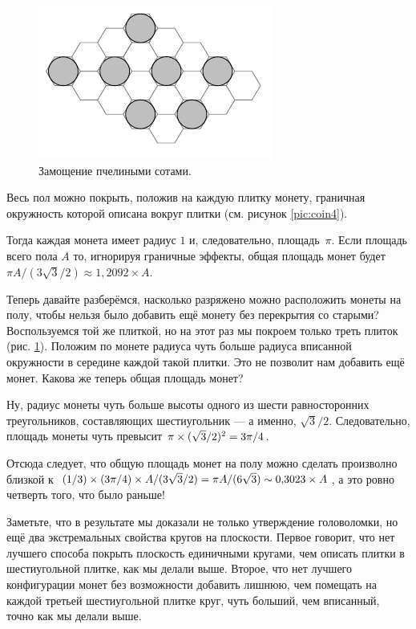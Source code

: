 \begin{figure}[t!]
\centering
\includegraphics[scale=1]{pics/coin5}
\caption{Замощение пчелиными сотами.}
\label{pic:coin5}
\end{figure}

Весь пол можно покрыть, положив на каждую плитку монету, граничная окружность которой описана вокруг плитки (см. рисунок \ref{pic:coin4}).

Тогда каждая монета имеет радиус $1$ и, следовательно, площадь~$\pi$.
Если площадь всего пола $A$ то, игнорируя граничные эффекты, общая площадь монет будет $\pi A/(3\sqrt{3}/2)\approx 1{,}2092\times A$.

Теперь давайте разберёмся, насколько разряжено можно расположить монеты на полу, чтобы нельзя было добавить ещё монету без перекрытия со старыми?
Воспользуемся той же плиткой, но на этот раз мы покроем только треть плиток (рис. \ref{pic:coin5}).
Положим по монете радиуса чуть больше радиуса вписанной окружности в середине каждой такой плитки. 
Это не позволит нам добавить ещё монет.
Какова же теперь общая площадь монет?

Ну, радиус монеты чуть больше высоты одного из шести равносторонних треугольников, составляющих шестиугольник — а именно, $\sqrt{3}/2$.
Следовательно, площадь монеты чуть превысит $\pi \z\times (\sqrt{3}/2)^2 \z= 3\pi/4$.

Отсюда следует, что общую площадь монет на полу можно сделать произволно близкой к $(1/3) \times (3\pi/4) \times A/(3\sqrt{3}/2) = \pi A/(6 \sqrt{3}) \z\sim 0{,}3023 \times A$, а это ровно четверть того, что было раньше!

Заметьте, что в результате мы доказали не только утверждение головоломки, но ещё два экстремальных свойства кругов на плоскости.
Первое говорит, что нет лучшего способа покрыть плоскость единичными кругами, чем описать плитки в шестиугольной плитке, как мы делали выше.
Второе, что нет лучшего конфигурации монет без возможности добавить лишнюю, чем помещать на каждой третьей шестиугольной плитке круг, чуть больший, чем вписанный, точно как мы делали выше.

